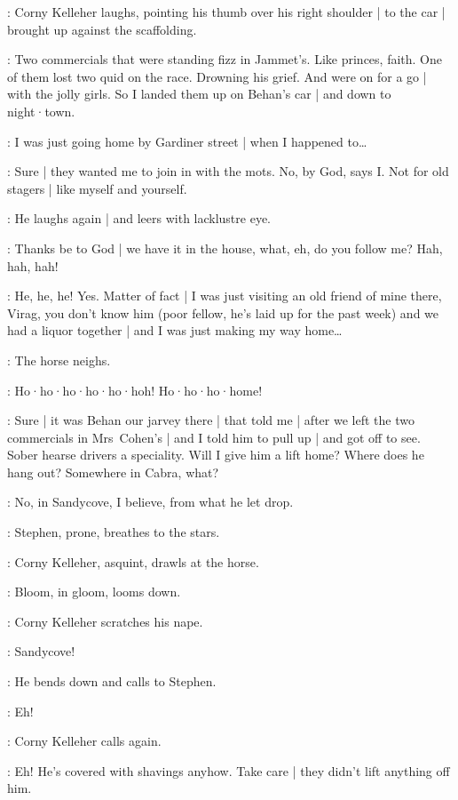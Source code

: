 :
Corny Kelleher laughs,
pointing his thumb over his right shoulder |
%
to the car |
brought up against the scaffolding.

\Corny:
Two commercials that were standing fizz in Jammet's.
Like princes,
faith.
One of them lost two quid on the race.
Drowning his grief.
And were on for a go |
with the jolly girls.
So I landed them up on Behan's car |
and down to night·town.

\Bloom:
I was just going home by Gardiner street |
when I happened to…

\Corny:
Sure |
they wanted me to join in with the mots.
No,
by God,
says I\@.
Not for old stagers |
like myself and yourself.

:
He laughs again |
and leers with lacklustre eye.

\Corny:
Thanks be to God |
we have it in the house,
what,
eh,
do you follow me?
Hah,
hah,
hah!

\Bloom:
He,
he,
he!
Yes.
Matter of fact |
I was just visiting an old friend of mine there,
Virag,
you don't know him
(poor fellow,
he's laid up for the past week)
and we had a liquor together |
and I was just making my way home…

:
The horse neighs.

\Horse:
Ho·ho·ho·ho·ho·hoh!
Ho·ho·ho·home!

\Corny:
Sure |
it was Behan our jarvey there |
that told me |
after we left the two commercials in Mrs~Cohen's |
and I told him to pull up |
and got off to see.
Sober hearse drivers a speciality.
Will I give him a lift home?
Where does he hang out?
Somewhere in Cabra,
what?

\Bloom:
No,
in Sandycove,
I believe,
from what he let drop.

:
Stephen,
prone,
breathes to the stars.

:
Corny Kelleher,
asquint,
drawls at the horse.

:
Bloom,
in gloom,
looms down.

:
Corny Kelleher scratches his nape.

\Corny:
Sandycove!

:
He bends down and calls to Stephen.

\Corny:
Eh!

:
Corny Kelleher calls again.

\Corny:
Eh!
He's covered with shavings anyhow.
Take care |
they didn't lift anything off him.

